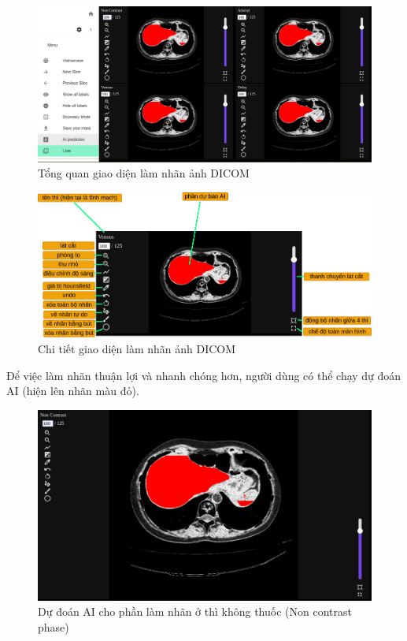 \begin{figure}[H]
    \centering
    \includegraphics[width=\textwidth]{images/chapter-07-images/user-ui-medical-labeling.png}
    \caption{Tổng quan giao diện làm nhãn ảnh DICOM}
\end{figure}

\begin{figure}[H]
    \centering
    \includegraphics[width=\textwidth]{images/chapter-07-images/ui-labeling-13.png}
    \caption{Chi tiết giao diện làm nhãn ảnh DICOM}
\end{figure}

Để việc làm nhãn thuận lợi và nhanh chóng hơn, người dùng có thể chạy dự đoán AI (hiện lên nhãn màu đỏ).
\begin{figure}[H]
    \centering
    \includegraphics[width=\textwidth]{images/chapter-07-images/user-non-contrast-demo.png}
    \caption{Dự đoán AI cho phần làm nhãn ở thì không thuốc (Non contrast phase)}
\end{figure}

